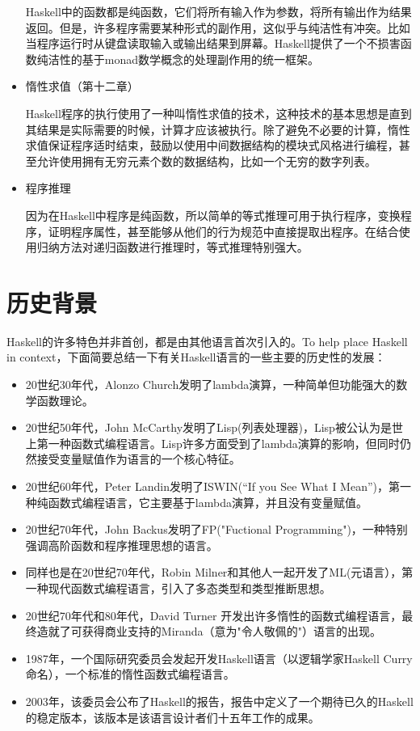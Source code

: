 \begin{itemize}
Haskell中的函数都是纯函数，它们将所有输入作为参数，将所有输出作为结果返回。但是，许多程序需要某种形式的副作用，这似乎与纯洁性有冲突。比如当程序运行时从键盘读取输入或输出结果到屏幕。Haskell提供了一个不损害函数纯洁性的基于monad数学概念的处理副作用的统一框架。

\item 惰性求值（第十二章）

Haskell程序的执行使用了一种叫惰性求值的技术，这种技术的基本思想是直到其结果是实际需要的时候，计算才应该被执行。除了避免不必要的计算，惰性求值保证程序适时结束，鼓励以使用中间数据结构的模块式风格进行编程，甚至允许使用拥有无穷元素个数的数据结构，比如一个无穷的数字列表。

\item 程序推理

因为在Haskell中程序是纯函数，所以简单的等式推理可用于执行程序，变换程序，证明程序属性，甚至能够从他们的行为规范中直接提取出程序。在结合使用归纳方法对递归函数进行推理时，等式推理特别强大。
\end{itemize}

\section{历史背景}
Haskell的许多特色并非首创，都是由其他语言首次引入的。To help place Haskell in context，下面简要总结一下有关Haskell语言的一些主要的历史性的发展： 

\begin{itemize}
\item 20世纪30年代，Alonzo Church发明了lambda演算，一种简单但功能强大的数学函数理论。
\item 20世纪50年代，John McCarthy发明了Lisp(列表处理器)，Lisp被公认为是世上第一种函数式编程语言。Lisp许多方面受到了lambda演算的影响，但同时仍然接受变量赋值作为语言的一个核心特征。
\item 20世纪60年代，Peter Landin发明了ISWIN(“If you See What I Mean”)，第一种纯函数式编程语言，它主要基于lambda演算，并且没有变量赋值。
\item 20世纪70年代，John Backus发明了FP("Fuctional Programming")，一种特别强调高阶函数和程序推理思想的语言。
\item 同样也是在20世纪70年代，Robin Milner和其他人一起开发了ML(元语言），第一种现代函数式编程语言，引入了多态类型和类型推断思想。
\item 20世纪70年代和80年代，David Turner 开发出许多惰性的函数式编程语言，最终造就了可获得商业支持的Miranda（意为"令人敬佩的"）语言的出现。
\item 1987年，一个国际研究委员会发起开发Haskell语言（以逻辑学家Haskell Curry命名），一个标准的惰性函数式编程语言。
\item 2003年，该委员会公布了Haskell的报告，报告中定义了一个期待已久的Haskell的稳定版本，该版本是该语言设计者们十五年工作的成果。
\end{itemize}

